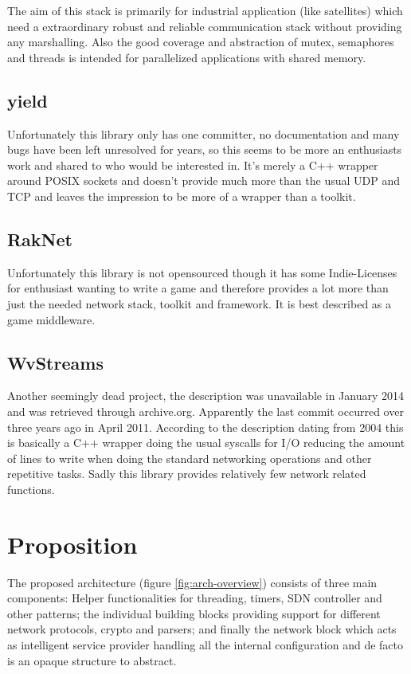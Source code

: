 \documentclass[twocolumn,english]{IEEEtran}
\theoremstyle{plain}
\theoremstyle{plain}
\begin{document}
The aim of this stack is primarily for industrial application (like
satellites) which need a extraordinary robust and reliable communication stack
without providing any marshalling. Also the good coverage and abstraction of
mutex, semaphores and threads is intended for parallelized applications with
shared memory.

\subsection{yield\cite{yield}} 
Unfortunately this library only has one committer, no documentation and many
bugs have been left unresolved for years, so this seems to be more an
enthusiasts work and shared to who would be interested in. It's merely a C++
wrapper around POSIX sockets and doesn't provide much more than the usual UDP
and TCP and leaves the impression to be more of a wrapper than a toolkit.

\subsection{RakNet\cite{raknet}}
Unfortunately this library is not opensourced though it has some
Indie-Licenses for enthusiast wanting to write a game and therefore provides a
lot more than just the needed network stack, toolkit and framework. It is best
described as a game middleware.

\subsection{WvStreams\cite{wvstreams}}
Another seemingly dead project, the description was unavailable in January
2014 and was retrieved through archive.org. Apparently the last commit
occurred over three years ago in April 2011. According to the description
dating from 2004 this is basically a C++ wrapper doing the usual syscalls for
I/O reducing the amount of lines to write when doing the standard networking
operations and other repetitive tasks. Sadly this library provides relatively
few network related functions.

\section{Proposition}

The proposed architecture (figure \ref{fig:arch-overview}) consists of three
main components: Helper functionalities for threading, timers, SDN controller
and other patterns; the individual building blocks providing support for
different network protocols, crypto and parsers; and finally the network block
which acts as intelligent service provider handling all the internal
configuration and de facto is an opaque structure to abstract.
\end{document}
